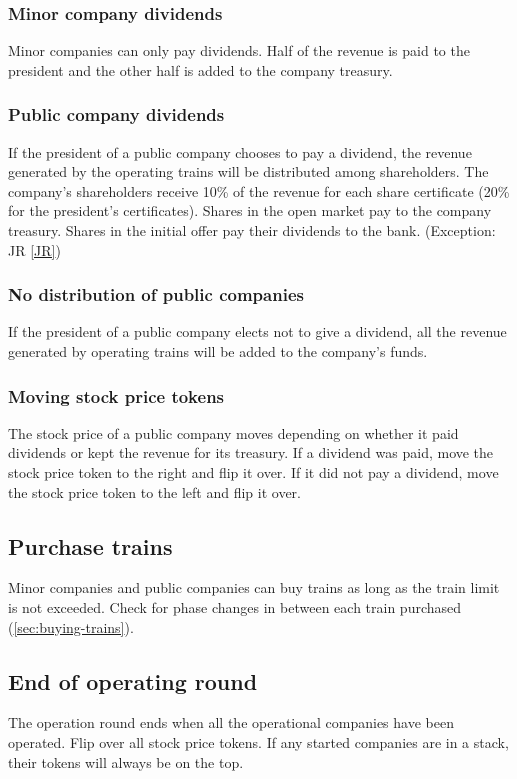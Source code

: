 \documentclass{article}
\begin{document}
\begin{CJK}{UTF8}{min}
\begin{multicols}{2}
\subsubsection{Minor company dividends} \label{or-minor-dividends}
Minor companies can only pay dividends. Half of the revenue is paid to
the president and the other half is added to the company treasury.

\subsubsection{Public company dividends} \label{or-public-dividends}
If the president of a public company chooses to pay a dividend, the
revenue generated by the operating trains will be distributed among
shareholders. The company's shareholders receive 10\% of the revenue
for each share certificate (20\% for the president's
certificates). Shares in the open market pay to the company
treasury. Shares in the initial offer pay their dividends to the
bank. (Exception: JR \autoref{JR})

\subsubsection{No distribution of public companies} \label{or-withholding}
If the president of a public company elects not to give a dividend,
all the revenue generated by operating trains will be added to the
company's funds.

\subsubsection{Moving stock price tokens} \label{or-moving-stock-prices}
The stock price of a public company moves depending on whether it paid
dividends or kept the revenue for its treasury. If a dividend was
paid, move the stock price token to the right and flip it over. If it
did not pay a dividend, move the stock price token to the left and
flip it over.

\subsection{Purchase trains}
Minor companies and public companies can buy trains as long as
the train limit is not exceeded. Check for phase changes in between
each train purchased (\autoref{sec:buying-trains}).

\subsection{End of operating round}
The operation round ends when all the operational companies have been
operated. Flip over all stock price tokens. If any started companies
are in a stack, their tokens will always be on the top.


\end{multicols}
\end{CJK}
\end{document}
